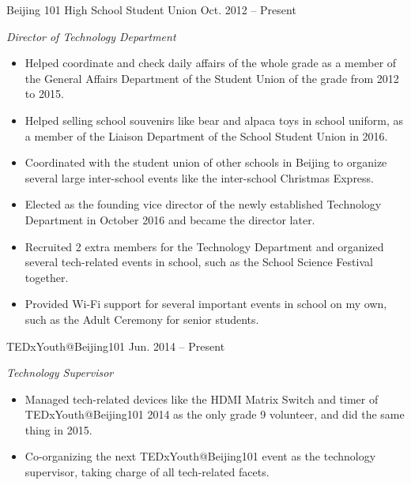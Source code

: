 \documentclass[hidelinks]{adamyi-cv} %
\begin{document}
\begin{entrylist}


\entry
{Beijing 101 High School Student Union}
{Oct. 2012 -- Present}
{\emph{Director of Technology Department}
\begin{itemize}
\item Helped coordinate and check daily affairs of the whole grade as a member of the General Affairs Department of the Student Union of the grade from 2012 to 2015.
\item Helped selling school souvenirs like bear and alpaca toys in school uniform, as a member of the Liaison Department of the School Student Union in 2016.
\item Coordinated with the student union of other schools in Beijing to organize several large inter-school events like the inter-school Christmas Express.
\item Elected as the founding vice director of the newly established Technology Department in October 2016 and became the director later.
\item Recruited 2 extra members for the Technology Department and organized several tech-related events in school, such as the School Science Festival together.
\item Provided Wi-Fi support for several important events in school on my own, such as the Adult Ceremony for senior students.
\end{itemize}}


\entry
{TEDxYouth@Beijing101}
{Jun. 2014 -- Present}
{\emph{Technology Supervisor}
\begin{itemize}
\item Managed tech-related devices like the HDMI Matrix Switch and timer of TEDxYouth@Beijing101 2014 as the only grade 9 volunteer, and did the same thing in 2015.
\item Co-organizing the next TEDxYouth@Beijing101 event as the technology supervisor, taking charge of all tech-related facets.
\end{itemize}}


\end{entrylist}
\end{document}
